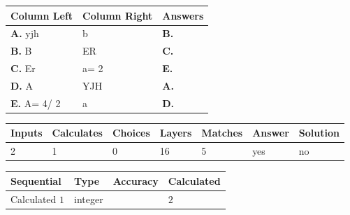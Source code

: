 \documentclass[12pt]{article}
\begin{document}
  
 
 
\noindent{}
  
  
\begin{tabular}{|l|l|l|}
 \hline
 Column Left & Column Right  & Answers       \\ 
 \hline
{\textbf{\large{
A.}}}
yjh
  & 
b
 & 
{\textbf{\large{
B.}}}
 \\ 
 \hline
{\textbf{\large{
B.}}}
B
  & 
ER
 & 
{\textbf{\large{
C.}}}
 \\ 
 \hline
{\textbf{\large{
C.}}}
Er
  & 
 a= %
2
 & 
{\textbf{\large{
E.}}}
 \\ 
 \hline
{\textbf{\large{
D.}}}
A
  & 
YJH
 & 
{\textbf{\large{
A.}}}
 \\ 
 \hline
{\textbf{\large{
E.}}}
 A= %
4/ %
2

  & 
a
 & 
{\textbf{\large{
D.}}}
 \\ 
 \hline
 \end{tabular}
  
  
 
 
\noindent{}
 
 
 
   
   
   
   
\noindent\begin{tabular}{|l|l|l|l|l|l|l|}
 \hline
Inputs & Calculates & Choices & Layers & Matches & Answer & Solution \\ \hline
           2 & 
           1 & 
           0
  & 
          16 & 
           5 & 
  yes & 
  no 
  \\ \hline
 \end{tabular}
   
   
   
   
\noindent{}
   
   
  
  
\noindent\begin{tabular}{|l|l|l|l|}
\hline
 Sequential & Type & Accuracy & Calculated \\ 
\hline
 
 
  Calculated $           1$ & integer &  & 
  $ 2 $ 
 \\  \hline  
 \end{tabular}
   
   
   
\end{document}
